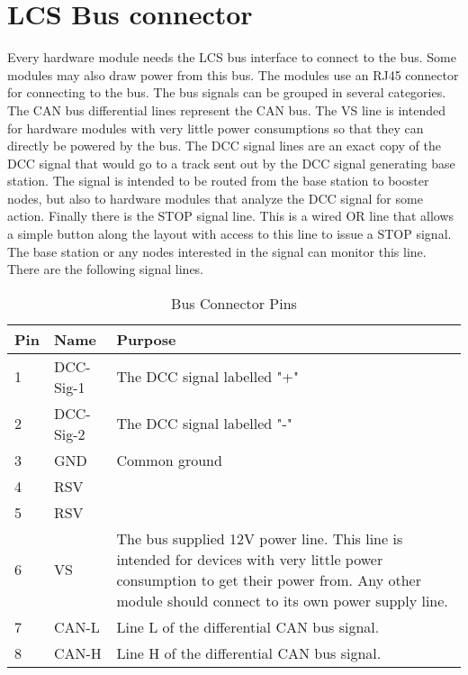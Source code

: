 \section{LCS Bus connector}

Every hardware module needs the LCS bus interface to connect to the bus. Some modules may also draw power from this bus. The modules use an RJ45 connector for connecting to the bus. The bus signals can be grouped in several categories. The CAN bus differential lines represent the CAN bus. The VS line is intended for hardware modules with very little power consumptions so that they can directly be powered by the bus. The DCC signal lines are an exact copy of the DCC signal that would go to a track sent out by the DCC signal generating base station. The signal is intended to be routed from the base station to booster nodes, but also to hardware modules that analyze the DCC signal for some action. Finally there is the STOP signal line. This is a wired OR line that allows a simple button along the layout with access to this line to issue a STOP signal. The base station or any nodes interested in the signal can monitor this line. There are the following signal lines.

\begin{table}[!ht]
    \begin{center}
        \caption{Bus Connector Pins}
        \begin{tabular}{|l|l|p{}|}
            \toprule
            \textbf{Pin} & \textbf{Name} & \textbf{Purpose} \\
            \midrule
            1 & DCC-Sig-1 & The DCC signal labelled "+" \\
            \midrule
            2 & DCC-Sig-2 & The DCC signal labelled "-" \\
            \midrule
            3 & GND &  Common ground \\
            \midrule
            4 & RSV &  \\
            \midrule
            5 & RSV &  \\
            \midrule
            6 & VS & The bus supplied 12V power line. This line is intended for devices with very little power consumption to get their power from. Any other module should connect to its own power supply line. \\
            \midrule
            7 & CAN-L &  Line L of the differential CAN bus signal. \\
            \midrule
            8 & CAN-H &  Line H of the differential CAN bus signal. \\
            \bottomrule
        \end{tabular}
    \end{center}
\end{table}

